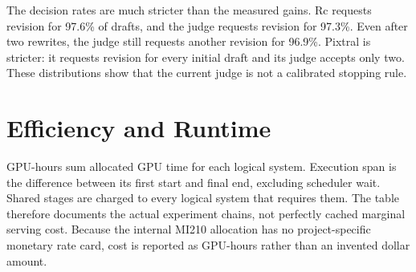 \documentclass[11pt]{article}
\begin{document}
The decision rates are much stricter than the measured gains. Rc requests
revision for 97.6\% of drafts, and the judge requests revision for 97.3\%. Even
after two rewrites, the judge still requests another revision for 96.9\%.
Pixtral is stricter: it requests revision for every initial draft and its judge
accepts only two. These distributions show that the current judge is not a
calibrated stopping rule.

\FloatBarrier


\section{Efficiency and Runtime}

GPU-hours sum allocated GPU time for each logical system. Execution span is the
difference between its first start and final end, excluding scheduler wait.
Shared stages are charged to every logical system that requires them. The table
therefore documents the actual experiment chains, not perfectly cached marginal
serving cost. Because the internal MI210 allocation has no project-specific
monetary rate card, cost is reported as GPU-hours rather than an invented dollar
amount.
\end{document}
